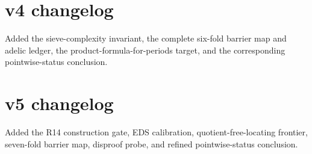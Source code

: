 \documentclass[11pt]{amsart}
\theoremstyle{plain}
\theoremstyle{remark}
\begin{document}
\section{v4 changelog}

\noindent Added the sieve-complexity invariant, the complete six-fold barrier map and adelic ledger, the product-formula-for-periods target, and the corresponding pointwise-status conclusion.

\section{v5 changelog}

\noindent Added the R14 construction gate, EDS calibration, quotient-free-locating frontier, seven-fold barrier map, disproof probe, and refined pointwise-status conclusion.
\end{document}

